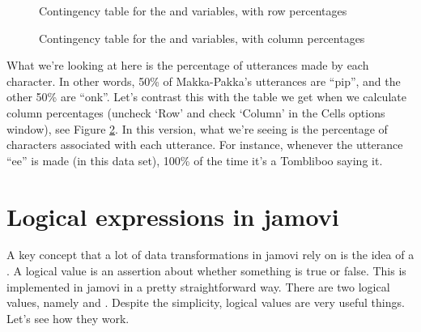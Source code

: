 \vspace{0.5cm}
\begin{figure}[!!htb]
\begin{center}
\caption{Contingency table for the  and  variables, with row percentages}
\label{fig:contingencyrow}
\HR
\end{center}
\end{figure}

\begin{figure}[!!htb]
\begin{center}
\caption{Contingency table for the  and  variables, with column percentages}
\label{fig:contingencycol}
\HR
\end{center}
\end{figure}

What we're looking at here is the percentage of utterances made by each character. In other words, 50\% of Makka-Pakka's utterances are ``pip'', and the other 50\% are ``onk''. Let's contrast this with the table we get when we calculate column percentages (uncheck `Row' and check `Column' in the Cells options window), see Figure \ref{fig:contingencycol}. In this version, what we're seeing is the percentage of characters associated with each utterance. For instance, whenever the utterance ``ee'' is made (in this data set), 100\% of the time it's a Tombliboo saying it. 


\section{Logical expressions in jamovi\label{sec:logicals}}

A key concept that a lot of data transformations in jamovi rely on is the idea of a . A logical value is an assertion about whether something is true or false. This is implemented in jamovi in a pretty straightforward way. There are two logical values, namely  and . Despite the simplicity, logical values are very useful things. Let's see how they work.


